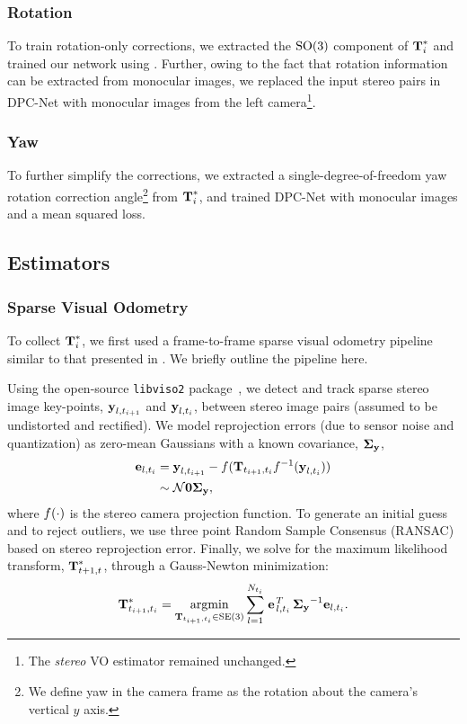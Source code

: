 \subsubsection{Rotation}
To train rotation-only corrections, we extracted the $\mathrm{SO}(3)$ component of  $\boldsymbol{\mathbf{T}}^*_i$ and trained our network using . Further, owing to the fact that rotation information can be extracted from monocular images, we replaced the input stereo pairs in DPC-Net with monocular images from the left camera\footnote{The \textit{stereo} VO estimator remained unchanged.}.

\subsubsection{Yaw}
To further simplify the corrections, we extracted a single-degree-of-freedom yaw rotation correction angle\footnote{We define yaw in the camera frame as the rotation about the camera's vertical $y$ axis.} from $\boldsymbol{\mathbf{T}}^*_i$, and trained DPC-Net with monocular images and a mean squared loss.


\subsection{Estimators}
\subsubsection{Sparse Visual Odometry}
To collect $ \boldsymbol{\mathbf{T}}^*_i$, we first used a frame-to-frame sparse visual odometry pipeline similar to that presented in \cite{Peretroukhin2016-om}. We briefly outline the pipeline here. 

Using the open-source \texttt{libviso2} package~\cite{Geiger2011-xe}, we detect and track sparse stereo image key-points, $\boldsymbol{\mathbf{y}}_{l,t_{i+1}}$ and $\boldsymbol{\mathbf{y}}_{l,t_{i}}$, between stereo image pairs (assumed to be undistorted and rectified).
We model reprojection errors (due to sensor noise
and quantization) as zero-mean Gaussians with a known covariance, $\boldsymbol{\mathbf{\Sigma_y}}$,
\begin{align}
 \boldsymbol{\mathbf{e}}_{l,t_i} &= \boldsymbol{\mathbf{y}}_{l,t_{i+1}} - f( \boldsymbol{\mathbf{T}}_{t_{i+1},t_i} 
    f^{-1}( \boldsymbol{\mathbf{y}}_{l,t_{i}} ) ) \\ &\sim \mathcal{N}{\boldsymbol{\mathbf{0}}}{\boldsymbol{\mathbf{\Sigma_y}}},
   \label{eq:image_error}
\end{align}
where $f(\cdot)$ is the stereo camera projection function. To generate an initial guess and to reject outliers, we use three point Random Sample Consensus (RANSAC) based on stereo reprojection error.
Finally, we solve for the maximum likelihood transform, $\boldsymbol{\mathbf{T}}_{t+1,t}^*$, through a Gauss-Newton minimization:
\begin{equation}
  \boldsymbol{\mathbf{T}}_{t_{i+1},t_i}^* = \operatorname*{argmin}_{\boldsymbol{\mathbf{T}}_{t_{i+1},t_i}\in\text{SE}(3)}\sum_{l=1}^{N_{t_i}} 
  \left.{\boldsymbol{\mathbf{e}}}\right.^T_{l,t_i} \boldsymbol{\mathbf{\Sigma_y}}^{-1} \boldsymbol{\mathbf{e}}_{l,t_i}.
\end{equation}

